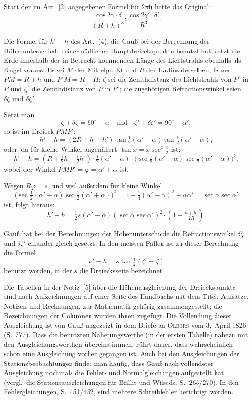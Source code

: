 \documentclass[12pt,a4paper]{article}
\newcommand{\tang}{\tan}
\theoremstyle{plain}
\theoremstyle{definition}
\theoremstyle{remark}
\begin{document}
Statt der im Art.~[2] angegebenen Formel f\"ur $2\pi\mathfrak{h}$ hatte das Original:
\[
\frac{\cos 2\gamma\cdot\delta}{(R+h)^3} : \frac{\cos 2\gamma'\cdot\delta'}{R^3}.
\]

Die Formel f\"ur $h'-h$ des Art.~(4), die Gau\ss{} bei der Berechnung der H\"ohenunterschiede seiner s\"udlichen Hauptdreieckspunkte benutzt hat, setzt die Erde innerhalb der in Betracht kommenden L\"ange des Lichtstrahls ebenfalls als Kugel voraus. Es sei $M$ der Mittelpunkt und $R$ der Radius derselben, ferner $PM = R+h$ und $P'M = R+H$; $\zeta$ sei die Zenithdistanz des Lichtstrahls von $P'$ in $P$ und $\zeta'$ die Zenithdistanz von $P$ in $P'$; die zugeh\"origen Refractionswinkel seien $\delta\zeta$ und $\delta\zeta'$.

Setzt man
\[
\zeta + \delta\zeta = 90^{\circ} - \alpha \quad \text{und} \quad \zeta' + \delta\zeta' = 90^{\circ} - \alpha',
\]
so ist im Dreieck $PMP'$:
\[
h' - h = (2R + h + h')\tang\tfrac{1}{2}(\alpha' - \alpha)\tang\tfrac{1}{2}(\alpha' + \alpha),
\]
oder, da f\"ur kleine Winkel angen\"ahert $\tang x = x\sec^2\tfrac{x}{2}$ ist:
\[
h' - h = (R + \tfrac{1}{2}h + \tfrac{1}{2}h') \cdot \tfrac{1}{2}(\alpha' - \alpha) \cdot \bigl(\sec\tfrac{1}{2}(\alpha' - \alpha)\sec\tfrac{1}{2}(\alpha' + \alpha)\bigr)^2,
\]
wobei der Winkel $PMP' = \varphi = \alpha' + \alpha$ ist.

Wegen $R\varphi = s$, und weil au\ss erdem f\"ur kleine Winkel
\[
\bigl(\sec\tfrac{1}{2}(\alpha' - \alpha)\sec\tfrac{1}{2}(\alpha' + \alpha)\bigr)^2 = 1 + \tfrac{1}{4}(\alpha' - \alpha)^2 + \alpha\alpha' = \sec\alpha\sec\alpha'
\]
ist, folgt hieraus:
\[
h' - h = \tfrac{1}{2}s(\alpha' - \alpha)(\sec\alpha\sec\alpha')^2 \cdot (1 + \tfrac{h+h'}{2R}).
\]

Gau\ss{} hat bei den Berechnungen der H\"ohenunterschiede die Refractionswinkel $\delta\zeta$ und $\delta\zeta'$ einander gleich gesetzt. In den meisten F\"allen ist zu dieser Berechnung die Formel
\[
h' - h = s\tang\tfrac{1}{2}(\zeta' - \zeta)
\]
benutzt worden, in der $s$ die Dreiecksseite bezeichnet.

Die Tabellen in der Notiz~[5] \"uber die H\"ohenausgleichung der Dreieckspunkte sind nach Aufzeichnungen auf einer Seite des Handbuchs mit dem Titel: \glqq Aufs\"atze, Notizen und Rechnungen, zur Mathematik geh\"orig\grqq{} zusammengestellt; die Bezeichnungen der Columnen wurden ihnen zugef\"ugt. Die Vollendung dieser Ausgleichung ist von Gau\ss{} angezeigt in dem Briefe an \textsc{Olbers} vom 3.~April 1826 (S.~377). Dass die benutzten N\"aherungswerthe (in der ersten Tabelle) nahezu mit den Ausgleichungswerthen \"ubereinstimmen, r\"uhrt daher, dass wahrscheinlich schon eine Ausgleichung vorher gegangen ist. Auch bei den Ausgleichungen der Stationsbeobachtungen findet man h\"aufig, dass Gau\ss{} nach vollendeter Ausgleichung nochmals die Fehler- und Normalgleichungen aufgestellt hat (vergl.\ die Stationsausgleichungen f\"ur Brillit und Wilsede, S.~265/270). In den Fehlergleichungen, S.~451/452, sind mehrere Schreibfehler berichtigt worden.
\end{document}
